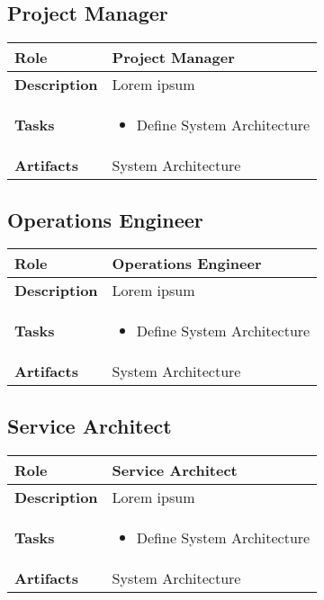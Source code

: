 \subsection{Project Manager}
 \label{table:ch6_Role_Project_Manager}
\begin{tabular}
	{|m{2cm}|m{10cm}|} \hline \bfseries Role & Project Manager\\
	\hline \bfseries Description & Lorem ipsum\\
	\hline \bfseries Tasks & 
	\begin{itemize}
		\item Define System Architecture 
	\end{itemize}
	\\
	\hline \bfseries Artifacts & System Architecture\\
	\hline 	
\end{tabular}

\subsection{Operations Engineer}
 \label{table:ch6_Role_Operations_Engineer}
\begin{tabular}
	{|m{2cm}|m{10cm}|} \hline \bfseries Role & Operations Engineer\\
	\hline \bfseries Description & Lorem ipsum\\
	\hline \bfseries Tasks & 
	\begin{itemize}
		\item Define System Architecture 
	\end{itemize}
	\\
	\hline \bfseries Artifacts & System Architecture\\
	\hline 
\end{tabular}

\subsection{Service Architect}
 \label{table:ch6_Role_Service_Architect}
\begin{tabular}
	{|m{2cm}|m{10cm}|} \hline \bfseries Role & Service Architect\\
	\hline \bfseries Description & Lorem ipsum\\
	\hline \bfseries Tasks & 
	\begin{itemize}
		\item Define System Architecture 
	\end{itemize}
	\\
	\hline \bfseries Artifacts & System Architecture\\
	\hline 
\end{tabular}

